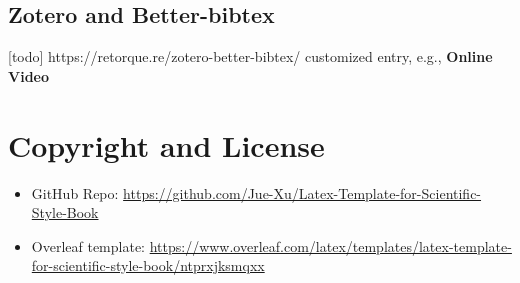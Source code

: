 \subsection{Zotero and Better-bibtex}
[todo]
https://retorque.re/zotero-better-bibtex/
customized entry, e.g., \textbf{Online Video}

\section{Copyright and License}

\begin{itemize}
    \item GitHub Repo: \url{https://github.com/Jue-Xu/Latex-Template-for-Scientific-Style-Book}
    \item Overleaf template: \url{https://www.overleaf.com/latex/templates/latex-template-for-scientific-style-book/ntprxjksmqxx}
\end{itemize}


